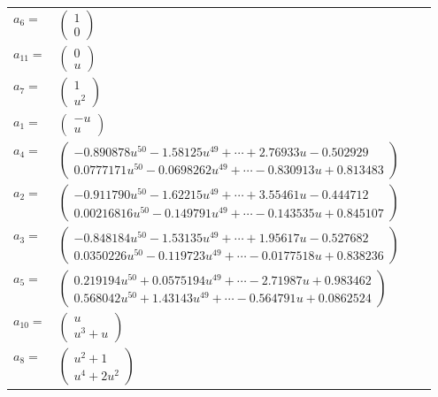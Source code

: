 \documentclass[1p]{elsarticle_modified}
\theoremstyle{definition}
\begin{document}
\begin{tabular}{m{7pt} m{180pt} m{7pt} m{180pt} }
\flushright $a_{6}=$&$\begin{pmatrix}1\\0\end{pmatrix}$ \\
\flushright $a_{11}=$&$\begin{pmatrix}0\\u\end{pmatrix}$ \\
\flushright $a_{7}=$&$\begin{pmatrix}1\\u^2\end{pmatrix}$ \\
\flushright $a_{1}=$&$\begin{pmatrix}- u\\u\end{pmatrix}$ \\
\flushright $a_{4}=$&$\begin{pmatrix}-0.890878 u^{50}-1.58125 u^{49}+\cdots+2.76933 u-0.502929\\0.0777171 u^{50}-0.0698262 u^{49}+\cdots-0.830913 u+0.813483\end{pmatrix}$ \\
\flushright $a_{2}=$&$\begin{pmatrix}-0.911790 u^{50}-1.62215 u^{49}+\cdots+3.55461 u-0.444712\\0.00216816 u^{50}-0.149791 u^{49}+\cdots-0.143535 u+0.845107\end{pmatrix}$ \\
\flushright $a_{3}=$&$\begin{pmatrix}-0.848184 u^{50}-1.53135 u^{49}+\cdots+1.95617 u-0.527682\\0.0350226 u^{50}-0.119723 u^{49}+\cdots-0.0177518 u+0.838236\end{pmatrix}$ \\
\flushright $a_{5}=$&$\begin{pmatrix}0.219194 u^{50}+0.0575194 u^{49}+\cdots-2.71987 u+0.983462\\0.568042 u^{50}+1.43143 u^{49}+\cdots-0.564791 u+0.0862524\end{pmatrix}$ \\
\flushright $a_{10}=$&$\begin{pmatrix}u\\u^3+u\end{pmatrix}$ \\
\flushright $a_{8}=$&$\begin{pmatrix}u^2+1\\u^4+2 u^2\end{pmatrix}$ \\

\end{tabular}
\end{document}
